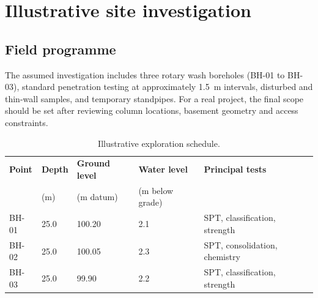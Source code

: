 \section{Illustrative site investigation}
\subsection{Field programme}
The assumed investigation includes three rotary wash boreholes (BH-01 to BH-03), standard
penetration testing at approximately \SI{1.5}{\metre} intervals, disturbed and thin-wall samples,
and temporary standpipes. For a real project, the final scope should be set after reviewing
column locations, basement geometry and access constraints.

\begin{table}[H]
\centering
\caption{Illustrative exploration schedule.}
\label{tab:exploration}
\begin{tabularx}{\textwidth}{@{}L{20mm}C{24mm}C{25mm}C{31mm}Y@{}}
\toprule
{}
\textbf{Point} & \textbf{Depth} & \textbf{Ground level} & \textbf{Water level} & \textbf{Principal tests} \\
 & (m) & (m datum) & (m below grade) & \\
\midrule
BH-01 & 25.0 & 100.20 & 2.1 & SPT, classification, strength \\
BH-02 & 25.0 & 100.05 & 2.3 & SPT, consolidation, chemistry \\
BH-03 & 25.0 &  99.90 & 2.2 & SPT, classification, strength \\
\bottomrule
\end{tabularx}
\end{table}

